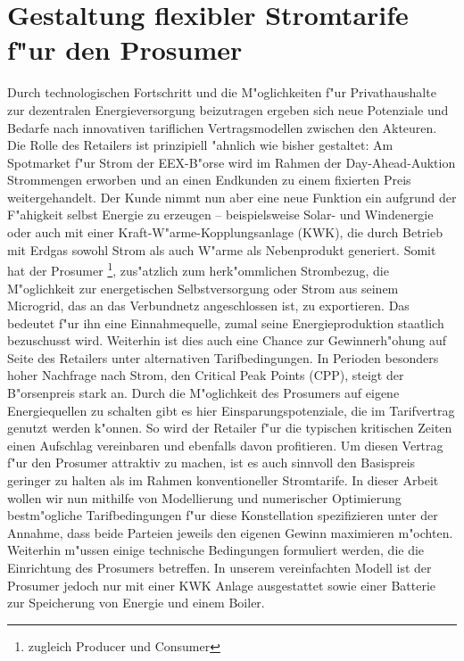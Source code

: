 \section{Gestaltung flexibler Stromtarife f"ur den Prosumer}
Durch technologischen Fortschritt und die M"oglichkeiten f"ur Privathaushalte zur dezentralen Energieversorgung beizutragen ergeben sich neue Potenziale und Bedarfe nach innovativen tariflichen Vertragsmodellen zwischen den Akteuren. Die Rolle des Retailers ist prinzipiell "ahnlich wie bisher gestaltet: Am Spotmarket f"ur Strom der EEX-B"orse wird im Rahmen der Day-Ahead-Auktion Strommengen erworben und an einen Endkunden zu einem fixierten Preis weitergehandelt. Der Kunde nimmt nun aber eine neue Funktion ein aufgrund der F"ahigkeit selbst Energie zu erzeugen -- beispielsweise Solar- und Windenergie oder auch mit einer Kraft-W"arme-Kopplungsanlage (KWK), die durch Betrieb mit Erdgas sowohl Strom als auch W"arme als Nebenprodukt generiert. Somit hat der Prosumer \footnote{zugleich Producer und Consumer}, zus"atzlich zum herk"ommlichen Strombezug, die M"oglichkeit zur energetischen Selbstversorgung oder Strom aus seinem Microgrid, das an das Verbundnetz angeschlossen ist, zu exportieren. Das bedeutet f"ur ihn eine  Einnahmequelle, zumal seine Energieproduktion staatlich bezuschusst wird. Weiterhin ist dies auch eine Chance zur Gewinnerh"ohung auf Seite des Retailers unter alternativen Tarifbedingungen. In Perioden besonders hoher Nachfrage nach Strom, den Critical Peak Points (CPP), steigt der B"orsenpreis stark an. Durch die M"oglichkeit des Prosumers auf eigene Energiequellen zu schalten gibt es hier Einsparungspotenziale, die im Tarifvertrag genutzt werden k"onnen. So wird der Retailer f"ur die typischen kritischen Zeiten einen Aufschlag vereinbaren und ebenfalls davon profitieren. Um diesen Vertrag f"ur den Prosumer attraktiv zu machen, ist es auch sinnvoll den Basispreis geringer zu halten als im Rahmen konventioneller Stromtarife. In dieser Arbeit wollen wir nun mithilfe von Modellierung und numerischer Optimierung bestm"ogliche Tarifbedingungen f"ur diese Konstellation spezifizieren unter der Annahme, dass beide Parteien jeweils den eigenen Gewinn maximieren m"ochten. Weiterhin m"ussen einige technische Bedingungen formuliert werden, die die Einrichtung des Prosumers betreffen. In unserem vereinfachten Modell ist der Prosumer jedoch nur mit einer KWK Anlage ausgestattet sowie einer Batterie zur Speicherung von Energie und einem Boiler.